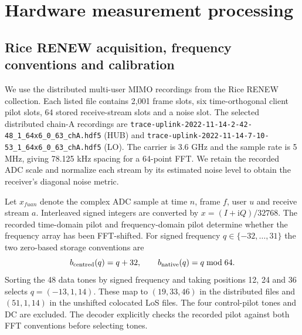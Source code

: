 \clearpage
\section{Hardware measurement processing}
\label{supp:note6}

\subsection*{Rice RENEW acquisition, frequency conventions and calibration}
We use the distributed multi-user MIMO recordings from the Rice RENEW collection.
Each listed file contains 2,001 frame slots, six time-orthogonal client pilot slots,
64 stored receive-stream slots and a noise slot. The selected distributed chain-A
recordings are \texttt{trace-uplink-2022-11-14-2-42-48\_1\_64x6\_0\_63\_chA.hdf5}
(HUB) and \texttt{trace-uplink-2022-11-14-7-10-53\_1\_64x6\_0\_63\_chA.hdf5}
(LO). The carrier is 3.6 GHz and the sample rate is 5 MHz, giving 78.125 kHz
spacing for a 64-point FFT. We retain the recorded ADC scale and normalize each stream by its estimated noise level to obtain the receiver's diagonal noise metric.

Let $x_{fuan}$ denote the complex ADC sample at time $n$, frame $f$, user $u$
and receive stream $a$. Interleaved signed integers are converted by
$x=(I+\mathrm{i}Q)/32768$. The recorded time-domain pilot and frequency-domain
pilot determine whether the frequency array has been FFT-shifted. For signed
frequency $q\in\{-32,\ldots,31\}$ the two zero-based storage conventions are
\begin{equation}
 b_{\rm centred}(q)=q+32,\qquad b_{\rm native}(q)=q\bmod64.
\end{equation}
Sorting the 48 data tones by signed frequency and taking positions 12, 24 and
36 selects $q=(-13,1,14)$. These map to $(19,33,46)$ in the distributed files
and $(51,1,14)$ in the unshifted colocated LoS files. The four control-pilot
tones and DC are excluded. The decoder explicitly checks the recorded pilot
against both FFT conventions before selecting tones.

